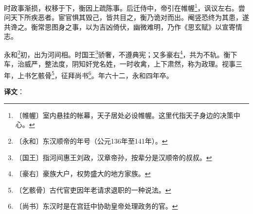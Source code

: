 \documentclass[12pt,UTF-8,openany]{ctexbook}
\begin{document}
\begin{normalsize}
    时政事渐损，权移于下，衡因上疏陈事。后迁侍中，帝引在帷幄\footnote{〔帷幄〕室内悬挂的帐幕，天子居处必设帷幄。这里代指天子身边的决策中心。}，讽议左右。尝问天下所疾恶者。宦官惧其毁己，皆共目之，衡乃诡对而出。阉竖恐终为其患，遂共谗之。衡常思图身之事，以为吉凶倚伏，幽微难明，乃作《思玄赋》以宣寄情志。
    
    永和\footnote{〔永和〕东汉顺帝的年号（公元136年至141年）。}初，出为河间相。时国王\footnote{〔国王〕指河间惠王刘政，汉章帝孙，按辈分是汉顺帝的叔叔。}骄奢，不遵典宪；又多豪右\footnote{〔豪右〕豪族大户，权势盛大的地方家族。}，共为不轨。衡下车，治威严，整法度，阴知奸党名姓，一时收禽，上下肃然，称为政理。视事三年，上书乞骸骨\footnote{〔乞骸骨〕古代官吏因年老请求退职的一种说法。}，征拜尚书\footnote{〔尚书〕东汉时是在宫廷中协助皇帝处理政务的官。}。年六十二，永和四年卒。
\end{normalsize}


\newpage

\textbf{译文}：

\vspace{1em}
\end{document}
